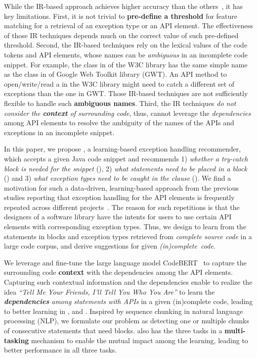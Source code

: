 While the IR-based approach achieves higher accuracy than the
others~\cite{xrank-fse20}, it has key limitations. First, it is not
trivial to {\bf pre-define a threshold} for feature matching for a
retrieval of an exception type or an API element. The effectiveness of
those IR techniques depends much on the correct value of such
pre-defined threshold. Second, the IR-based techniques rely on the
lexical values of the code tokens and API elements, whose names can be
{\em ambiguous} in an incomplete code snippet. For example, the
 class in  of the W3C library has
the same simple name as the  class in
 of Google Web
Toolkit library (GWT). An API method to open/write/read a
 in the W3C library might need to catch a different set
of exceptions than the one in GWT. Those IR-based techniques are not
sufficiently flexible to handle such {\bf ambiguous names}. Third, the
IR techniques {\em do not consider the {\bf context} of surrounding
  code}, thus, cannot leverage the {\em dependencies} among API
elements to resolve the ambiguity of the names of the APIs and
  exceptions in an incomplete snippet.

In this paper, we propose {\tool}, a learning-based exception handling
recommender, which accepts a given Java code snippet and recommends 1)
{\em whether a try-catch block is needed for the snippet} ({\xblock}),
2) {\em what statements need to be placed in a  block}
({\xstate}) and 3) {\em what exception types need to be caught in the
   clause} ({\xtype}).  We find a motivation for such a
data-driven, learning-based approach from the previous studies
reporting that exception handling for the API elements is frequently
repeated across different
projects~\cite{chanchal-scam14,zhong-jss18}. The reason for such
repetitions is that the designers of a software library have the
intents for users to use certain API elements with corresponding
exception types. Thus, we design {\tool} to learn from the statements
in  blocks and exception types retrieved from {\em
  complete source code} in a large code corpus, and derive suggestions
for given {\em (in)complete~code}.

We leverage and fine-tune the large language model
CodeBERT~\cite{codebert-emnlp20} to capture the surrounding code {\bf context}
with the dependencies among the API elements. Capturing such
contextual information and the dependencies enable {\tool} to realize
the idea {\em ``Tell Me Your Friends, I'll Tell You Who You Are''} to
learn the {\em {\bf dependencies} among statements with APIs} in a given
(in)complete code, leading to better learning in {\xblock}, {\xstate}
and {\xtype}. Inspired by sequence chunking in natural language
processing (NLP), we formulate our problem as detecting one or
multiple chunks of consecutive statements that need 
blocks.
{\tool} also has the three tasks in a {\bf multi-tasking} mechanism
to enable the mutual impact among the learning, leading to
better performance in all three tasks.

